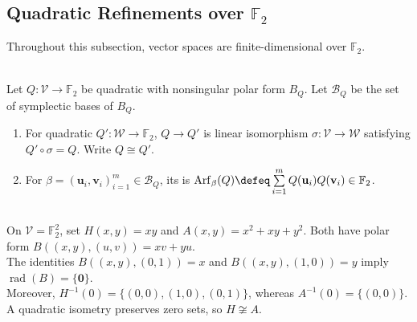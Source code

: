 \subsection{Quadratic Refinements over $\mathbb{F}_2$}

Throughout this subsection, vector spaces are finite-dimensional over $\mathbb{F}_2$.

\begin{definition} \label{def:arf-invariant-over-f2} \\
Let $Q:\mathcal{V}\to\mathbb{F}_2$ be quadratic with nonsingular polar form $B_Q$. Let $\mathscr{B}_Q$ be the set of symplectic bases of $B_Q$.
\begin{enumerate}[label=(\roman*)]
\setlength{\itemsep}{0pt}
\item For quadratic $Q':\mathcal{W}\to\mathbb{F}_2$,  $Q\to Q'$ is linear isomorphism $\sigma:\mathcal{V}\to\mathcal{W}$ satisfying $Q'\circ\sigma=Q$. Write $Q\cong Q'$.
\item For $\beta=(\mathbf{u}_i,\mathbf{v}_i)_{i=1}^{m}\in\mathscr{B}_Q$, its  is $\operatorname{Arf}_{\beta}(Q)\defeq\sum\limits_{i=1}^{m}Q(\mathbf{u}_i)Q(\mathbf{v}_i)\in\mathbb{F}_2$.
\end{enumerate}
\end{definition}

\begin{example} \label{ex:characteristic-two-quadratic-refinements-finite-field} \\
On $\mathcal{V}=\mathbb{F}_2^2$, set $H(x,y)=xy$ and $A(x,y)=x^2+xy+y^2$. Both have polar form $B((x,y),(u,v))=xv+yu$.\\
The identities $B((x,y),(0,1))=x$ and $B((x,y),(1,0))=y$ imply $\operatorname{rad}(B)=\{\mathbf{0}\}$.\\
Moreover, $H^{-1}(0)=\{(0,0),(1,0),(0,1)\}$, whereas $A^{-1}(0)=\{(0,0)\}$. A quadratic isometry preserves zero sets, so $H\not\cong A$.
\end{example}

